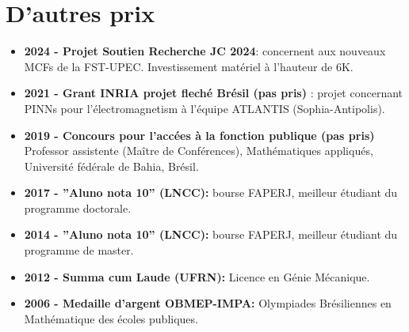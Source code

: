 \documentclass[french]{article}
\begin{document}
\section*{D'autres prix}
\begin{itemize}
\item \textbf{2024 - Projet Soutien Recherche JC 2024}: concernent aux nouveaux MCFs de la FST-UPEC. Investissement matériel à l'hauteur de 6K\texteuro.
\item \textbf{2021 - Grant INRIA projet fleché Brésil (pas pris)} : projet concernant PINNs pour l'électromagnetism à l'équipe ATLANTIS (Sophia-Antipolis).
\item \textbf{2019 - Concours pour l'accées à la fonction publique (pas pris)} Professor assistente (Maître de Conférences), Mathématiques appliqués, Université fédérale de Bahia, Brésil.
\item \textbf{2017 - ''Aluno nota 10'' (LNCC):} bourse FAPERJ, meilleur étudiant du programme doctorale.
\item \textbf{2014 - ''Aluno nota 10'' (LNCC):} bourse FAPERJ, meilleur étudiant du programme de master.
\item \textbf{2012 - Summa cum Laude (UFRN): } Licence en Génie Mécanique.
\item \textbf{2006 - Medaille d'argent OBMEP-IMPA:} Olympiades Brésiliennes en Mathématique des écoles publiques.
\end{itemize}
\end{document}
